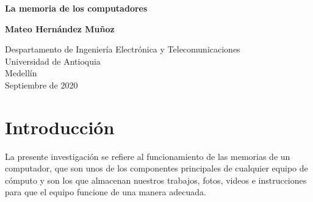 \documentclass{article}
\begin{document}
\begin{titlepage}
    \begin{center}
        \vspace*{1cm}
            
        \Huge
        \textbf{La memoria de los computadores}
            
        \vspace{0.5cm}
        \LARGE
            
        \vspace{1.5cm}
            
        \textbf{Mateo Hernández Muñoz}
        
        \vfill
        
        \vspace{0.8cm}
            
        \Large
        Despartamento de Ingeniería Electrónica y Telecomunicaciones\\
        Universidad de Antioquia\\
        Medellín\\
        Septiembre de 2020
            
    \end{center}
\end{titlepage}

\tableofcontents

\section{Introducción}
La presente investigación se refiere al funcionamiento de las memorias de un computador, que son unos de los componentes principales de cualquier equipo de cómputo y son los que almacenan nuestros trabajos, fotos, videos e instrucciones para que el equipo funcione de una manera adecuada.
\end{document}
